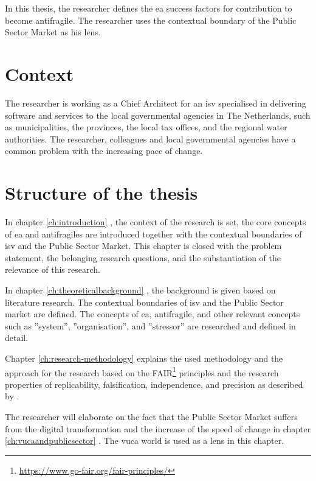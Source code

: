 In this thesis, the researcher defines the \acrfull{ea} success factors for contribution to become \gls{antifragile}. The researcher uses the contextual boundary of the Public Sector Market as his lens.

\section{Context}
\label{sec:context}
The researcher is working as a Chief Architect for an \acrfull{isv} specialised in delivering software and services to the local governmental agencies in The Netherlands, such as municipalities, the provinces, the local tax offices, and the regional water authorities. The researcher, colleagues and local governmental agencies have a common problem with the increasing pace of change.

\section{Structure of the thesis}
\label{sec:structure}
In chapter \ref{ch:introduction} , the context of the research is set, the core concepts of \acrshort{ea} and \glspl{antifragile} are introduced together with the contextual boundaries of \acrshort{isv} and the Public Sector Market. This chapter is closed with the problem statement, the belonging research questions, and the substantiation of the relevance of this research.

In chapter \ref{ch:theoreticalbackground} , the background is given based on literature research. The contextual boundaries of \acrshort{isv} and the Public Sector market are defined. The concepts of \acrshort{ea}, \gls{antifragile}, and other relevant concepts such as ''system'', ''organisation'', and ''stressor'' are researched and defined in detail. 

Chapter \ref{ch:research-methodology}  explains the used methodology and the approach for the research based on the FAIR\footnote{\url{https://www.go-fair.org/fair-principles/}} principles and the research properties of replicability, falsification, independence, and precision as described by \textcite{Recker2013}.

The researcher will elaborate on the fact that the Public Sector Market suffers from the digital transformation and the increase of the speed of change in chapter \ref{ch:vucaandpublicsector} . The \acrfull{vuca} world \parencite{Bennett2014} is used as a lens in this chapter.


